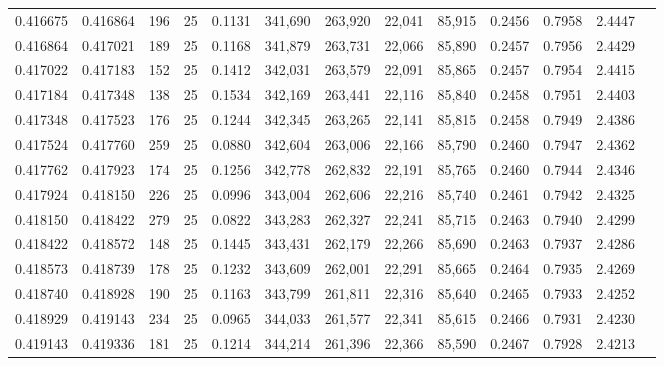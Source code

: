 \begin{tabular}{rrrrrrrrrrrrr}
0.416675 & 0.416864 &   196 &  25 &                                     0.1131 & 341,690 & 263,920 &  22,041 &  85,915 & 0.2456 & 0.7958 & 2.4447 \\
0.416864 & 0.417021 &   189 &  25 &                                     0.1168 & 341,879 & 263,731 &  22,066 &  85,890 & 0.2457 & 0.7956 & 2.4429 \\
0.417022 & 0.417183 &   152 &  25 &                                     0.1412 & 342,031 & 263,579 &  22,091 &  85,865 & 0.2457 & 0.7954 & 2.4415 \\
0.417184 & 0.417348 &   138 &  25 &                                     0.1534 & 342,169 & 263,441 &  22,116 &  85,840 & 0.2458 & 0.7951 & 2.4403 \\
0.417348 & 0.417523 &   176 &  25 &                                     0.1244 & 342,345 & 263,265 &  22,141 &  85,815 & 0.2458 & 0.7949 & 2.4386 \\
0.417524 & 0.417760 &   259 &  25 &                                     0.0880 & 342,604 & 263,006 &  22,166 &  85,790 & 0.2460 & 0.7947 & 2.4362 \\
0.417762 & 0.417923 &   174 &  25 &                                     0.1256 & 342,778 & 262,832 &  22,191 &  85,765 & 0.2460 & 0.7944 & 2.4346 \\
0.417924 & 0.418150 &   226 &  25 &                                     0.0996 & 343,004 & 262,606 &  22,216 &  85,740 & 0.2461 & 0.7942 & 2.4325 \\
0.418150 & 0.418422 &   279 &  25 &                                     0.0822 & 343,283 & 262,327 &  22,241 &  85,715 & 0.2463 & 0.7940 & 2.4299 \\
0.418422 & 0.418572 &   148 &  25 &                                     0.1445 & 343,431 & 262,179 &  22,266 &  85,690 & 0.2463 & 0.7937 & 2.4286 \\
0.418573 & 0.418739 &   178 &  25 &                                     0.1232 & 343,609 & 262,001 &  22,291 &  85,665 & 0.2464 & 0.7935 & 2.4269 \\
0.418740 & 0.418928 &   190 &  25 &                                     0.1163 & 343,799 & 261,811 &  22,316 &  85,640 & 0.2465 & 0.7933 & 2.4252 \\
0.418929 & 0.419143 &   234 &  25 &                                     0.0965 & 344,033 & 261,577 &  22,341 &  85,615 & 0.2466 & 0.7931 & 2.4230 \\
0.419143 & 0.419336 &   181 &  25 &                                     0.1214 & 344,214 & 261,396 &  22,366 &  85,590 & 0.2467 & 0.7928 & 2.4213 \\

\end{tabular}
